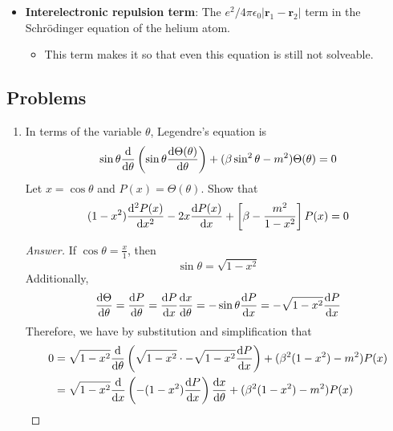 \documentclass[../notes.tex]{subfiles}
\begin{document}
\begin{itemize}
\begin{equation*}
    \end{equation*}
    \item \textbf{Interelectronic repulsion term}: The $e^2/4\pi\epsilon_0|\mathbf{r}_1-\mathbf{r}_2|$ term in the Schr\"{o}dinger equation of the helium atom.
    \begin{itemize}
        \item This term makes it so that even this equation is still not solveable.
    \end{itemize}
\end{itemize}


\subsection*{Problems}
\begin{enumerate}[label={\textbf{6-\arabic*.}},ref={6-\arabic*}]
    \item \label{prb:6-2}In terms of the variable $\theta$, Legendre's equation is
    \begin{equation*}
        \sin\theta\dv{\theta}\left( \sin\theta\dv{\Theta(\theta)}{\theta} \right)+(\beta\sin^2\theta-m^2)\Theta(\theta) = 0
    \end{equation*}
    Let $x=\cos\theta$ and $P(x)=\Theta(\theta)$. Show that
    \begin{equation*}
        (1-x^2)\dv[2]{P(x)}{x}-2x\dv{P(x)}{x}+\left[ \beta-\frac{m^2}{1-x^2} \right]P(x) = 0
    \end{equation*}
    \begin{proof}[Answer]
        If $\cos\theta=\frac{x}{1}$, then
        \begin{equation*}
            \sin\theta = \sqrt{1-x^2}
        \end{equation*}
        Additionally,
        \begin{equation*}
            \dv{\Theta}{\theta} = \dv{P}{\theta}
            = \dv{P}{x}\dv{x}{\theta}
            = -\sin\theta\dv{P}{x}
            = -\sqrt{1-x^2}\dv{P}{x}
        \end{equation*}
        Therefore, we have by substitution and simplification that
        \begin{align*}
            0 &= \sqrt{1-x^2}\dv{\theta}\left( \sqrt{1-x^2}\cdot -\sqrt{1-x^2}\dv{P}{x} \right)+(\beta^2(1-x^2)-m^2)P(x)\\
            &= \sqrt{1-x^2}\dv{x}\left( -(1-x^2)\dv{P}{x} \right)\dv{x}{\theta}+(\beta^2(1-x^2)-m^2)P(x)\\

\end{align*}
\end{proof}
\end{enumerate}
\end{document}
